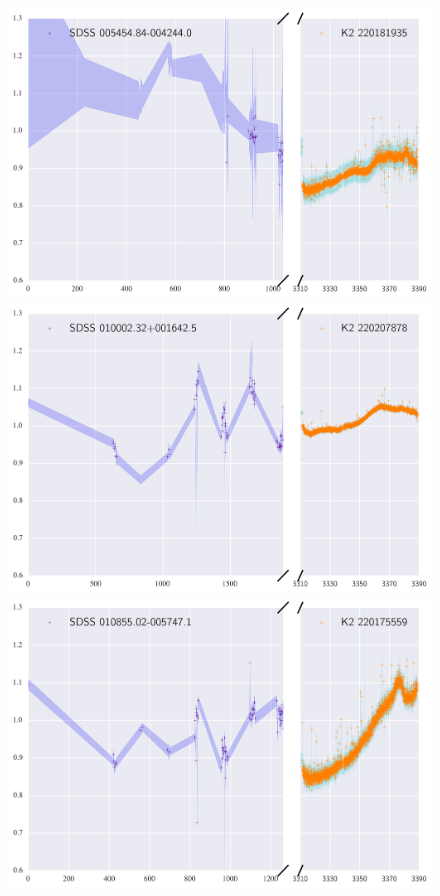 \documentclass[a4paper,fleqn,usenatbib]{mnras}
\begin{document}
          
       \begin{figure}
 	\includegraphics[width=\columnwidth]{220181935ExtendedLC.png}
	\includegraphics[width=\columnwidth]{220207878ExtendedLC.png}
 	\includegraphics[width=\columnwidth]{220175559ExtendedLC.png}
       	\caption{}
       	\label{fig:example_figure}
       \end{figure}      
\end{document}
